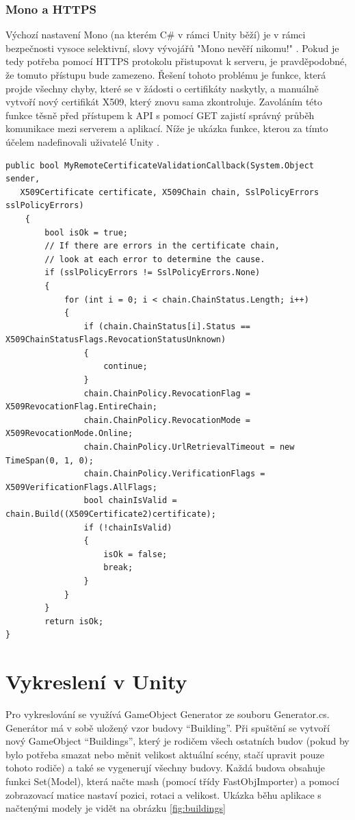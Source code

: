 \documentclass[thesis=B,czech]{FITthesis}[2012/06/26]
\begin{document}
	\subsubsection{Mono a HTTPS}
	
	Výchozí nastavení Mono (na kterém C\# v rámci Unity běží) je v rámci bezpečnosti vysoce selektivní, slovy vývojářů "Mono nevěří nikomu!" \cite{mono}. Pokud je tedy potřeba pomocí HTTPS protokolu přistupovat k serveru, je pravděpodobné, že tomuto přístupu bude zamezeno. Řešení tohoto problému je funkce, která projde všechny chyby, které se v žádosti o certifikáty naskytly, a manuálně vytvoří nový certifikát X509, který znovu sama zkontroluje. Zavoláním této funkce těsně před přístupem k API s pomocí GET zajistí správný průběh komunikace mezi serverem a aplikací. Níže je ukázka funkce, kterou za tímto účelem nadefinovali uživatelé Unity \cite{unityFAQ}.
	
	\begin{lstlisting}[frame=single]
public bool MyRemoteCertificateValidationCallback(System.Object sender,
   X509Certificate certificate, X509Chain chain, SslPolicyErrors sslPolicyErrors)
    {
        bool isOk = true;
        // If there are errors in the certificate chain,
        // look at each error to determine the cause.
        if (sslPolicyErrors != SslPolicyErrors.None)
        {
            for (int i = 0; i < chain.ChainStatus.Length; i++)
            {
                if (chain.ChainStatus[i].Status == X509ChainStatusFlags.RevocationStatusUnknown)
                {
                    continue;
                }
                chain.ChainPolicy.RevocationFlag = X509RevocationFlag.EntireChain;
                chain.ChainPolicy.RevocationMode = X509RevocationMode.Online;
                chain.ChainPolicy.UrlRetrievalTimeout = new TimeSpan(0, 1, 0);
                chain.ChainPolicy.VerificationFlags = X509VerificationFlags.AllFlags;
                bool chainIsValid = chain.Build((X509Certificate2)certificate);
                if (!chainIsValid)
                {
                    isOk = false;
                    break;
                }
            }
        }
        return isOk;
}
	\end{lstlisting}
	
	\section{Vykreslení v Unity}
    Pro vykreslování se využívá GameObject Generator ze souboru Generator.cs. Generátor má v sobě uložený vzor budovy “Building”. Při spuštění se vytvoří nový GameObject “Buildings”, který je rodičem všech ostatních budov (pokud by bylo potřeba smazat nebo měnit velikost aktuální scény, stačí upravit pouze tohoto rodiče) a také se vygenerují všechny budovy. Každá budova obsahuje funkci Set(Model), která načte mash (pomocí třídy FastObjImporter) a pomocí zobrazovací matice nastaví pozici, rotaci a velikost. Ukázka běhu aplikace s načtenými modely je vidět na obrázku \ref{fig:buildings}
    
\end{document}
